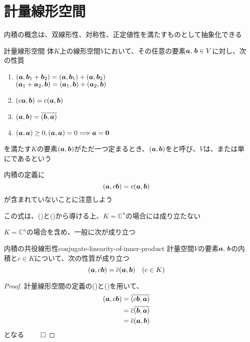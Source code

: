 \documentclass[../../../topic_linear-algebra]{subfiles}
\begin{document}
\sectionline
\section{計量線形空間}

内積の概念は、双線形性、対称性、正定値性を満たすものとして抽象化できる

\begin{definition}{計量線形空間}
  体$K$上の線形空間$V$において、その任意の要素$\vb*{a},\, \vb*{b} \in V$に対し、次の性質
  \begin{enumerate}[label=\romanlabel]
    \item $(\vb*{a}, \vb*{b}_1 + \vb*{b}_2) = (\vb*{a}, \vb*{b}_1) + (\vb*{a}, \vb*{b}_2)$ \\
          $(\vb*{a}_1 + \vb*{a}_2, \vb*{b}) = (\vb*{a}_1, \vb*{b}) + (\vb*{a}_2, \vb*{b})$
    \item $(c\vb*{a}, \vb*{b}) = c(\vb*{a}, \vb*{b})$
    \item $(\vb*{a}, \vb*{b}) = \overline{(\vb*{b}, \vb*{a})}$
    \item $(\vb*{a}, \vb*{a}) \geq 0, (\vb*{a}, \vb*{a}) = 0 \Longrightarrow \vb*{a} = \vb*{0}$
  \end{enumerate}
  を満たす$K$の要素$(\vb*{a},\vb*{b})$がただ一つ定まるとき、$(\vb*{a},\vb*{b})$をと呼び、$V$は、または単にであるという
\end{definition}

内積の定義に
\begin{equation*}
  (\vb*{a}, c\vb*{b}) = c(\vb*{a}, \vb*{b})
\end{equation*}
が含まれていないことに注意しよう

この式は、()と()から導ける上、$K = \mathbb{C}^n$の場合には成り立たない

\br

$K = \mathbb{C}^n$の場合を含め、一般に次が成り立つ

\begin{theorem}{内積の共役線形性}{conjugate-linearity-of-inner-product}
  計量空間$V$の要素$\vb*{a},\,\vb*{b}$の内積と$c \in K$について、次の性質が成り立つ
  \begin{equation*}
    (\vb*{a},c\vb*{b}) = \overline{c}(\vb*{a},\vb*{b}) \quad (c \in K)
  \end{equation*}
\end{theorem}

\begin{proof}
  計量線形空間の定義の()と()を用いて、
  \begin{align*}
    (\vb*{a},c\vb*{b}) & = \overline{(c\vb*{b},\vb*{a})}            \\
                       & = \overline{c}\overline{(\vb*{b},\vb*{a})} \\
                       & = \overline{c}(\vb*{a},\vb*{b})
  \end{align*}
  となる $\qed$
\end{proof}
\end{document}
